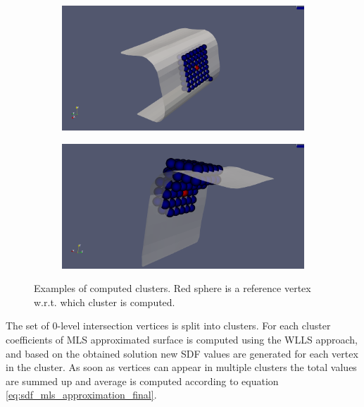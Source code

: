 \begin{figure}[H]
	\begin{center}
		\begin{subfigure}[b]{0.45\textwidth}
			\includegraphics[width=\textwidth]{figures/MlsCluster.png}
		\end{subfigure}
		\begin{subfigure}[b]{0.45\textwidth}
			\includegraphics[width=\textwidth]{figures/MlsCluster2.png}
		\end{subfigure}
	\end{center}
	\caption{Examples of computed clusters. Red sphere is a reference vertex w.r.t. which cluster is computed.}
	\label{fig:clusters}
\end{figure}

The set of 0-level intersection vertices is split into clusters. For each cluster coefficients of MLS approximated surface is computed using the WLLS approach, and based on the obtained solution new SDF values are generated for each vertex in the cluster. As soon as vertices can appear in multiple clusters the total values are summed up and average is computed according to equation \ref{eq:sdf_mls_approximation_final}.\\

